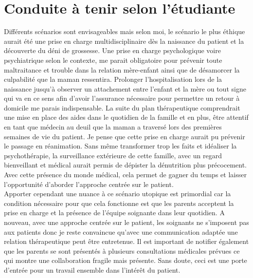 \section{Conduite à tenir selon l’étudiante }

Différents scénarios sont envisageables mais selon moi, le scénario le plus éthique aurait été une prise en charge multidisciplinaire dès la naissance du patient et la découverte du déni de grossesse. Une prise en charge psychologique voire psychiatrique selon le contexte, me parait obligatoire pour prévenir toute maltraitance et trouble dans la relation mère-enfant ainsi que de désamorcer la culpabilité que la maman ressentira. Prolonger l’hospitalisation lors de la naissance jusqu’à observer un attachement entre l’enfant et la mère ou tout signe qui va en ce sens afin d’avoir l’assurance nécessaire pour permettre un retour à domicile me parais indispensable. La suite du plan thérapeutique comprendrait une mise en place des aides dans le quotidien de la famille et en plus, être attentif en tant que médecin au deuil que la maman a traversé lors des premières semaines de vie du patient. Je pense que cette prise en charge aurait pu prévenir le passage en réanimation. Sans même transformer trop les faits et idéaliser la psychothérapie, la surveillance extérieure de cette famille, avec un regard bienveillant et médical aurait permis de dépister la dénutrition plus précocement. Avec cette présence du monde médical, cela permet de gagner du temps et laisser l’opportunité d’aborder l’approche centrée sur le patient.\\ 

Apporter cependant une nuance à ce scénario utopique est primordial car la condition nécessaire pour que cela fonctionne est que les parents acceptent la prise en charge et la présence de l’équipe soignante dans leur quotidien. A nouveau, avec une approche centrée sur le patient, les soignants ne s’imposent pas aux patients donc je reste convaincue qu’avec une communication adaptée une relation thérapeutique peut être entretenue. Il est important de notifier également que les parents se sont présentés à plusieurs consultations médicales prévues ce qui montre une collaboration fragile mais présente. Sans doute, ceci est une porte d’entrée pour un travail ensemble dans l’intérêt du patient.\\

